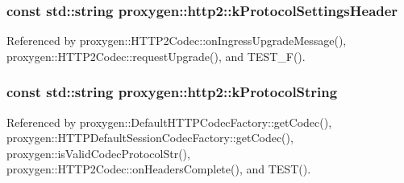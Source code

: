 \subsubsection[{k\+Protocol\+Settings\+Header}]{\setlength{\rightskip}{0pt plus 5cm}const std\+::string proxygen\+::http2\+::k\+Protocol\+Settings\+Header}\label{namespaceproxygen_1_1http2_aa5c6cfbc28e3c0014edbb044c0a752c2}


Referenced by proxygen\+::\+H\+T\+T\+P2\+Codec\+::on\+Ingress\+Upgrade\+Message(), proxygen\+::\+H\+T\+T\+P2\+Codec\+::request\+Upgrade(), and T\+E\+S\+T\+\_\+\+F().

\subsubsection[{k\+Protocol\+String}]{\setlength{\rightskip}{0pt plus 5cm}const std\+::string proxygen\+::http2\+::k\+Protocol\+String}\label{namespaceproxygen_1_1http2_a617ec2352707948ee6f85f207a4a7be3}


Referenced by proxygen\+::\+Default\+H\+T\+T\+P\+Codec\+Factory\+::get\+Codec(), proxygen\+::\+H\+T\+T\+P\+Default\+Session\+Codec\+Factory\+::get\+Codec(), proxygen\+::is\+Valid\+Codec\+Protocol\+Str(), proxygen\+::\+H\+T\+T\+P2\+Codec\+::on\+Headers\+Complete(), and T\+E\+S\+T().


